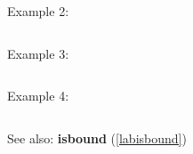 \noindent Example 2: 
\begin{center}\begin{minipage}{15cm}\begin{Verbatim}[frame=single]
\end{Verbatim}
\end{minipage}\end{center}
\noindent Example 3: 
\begin{center}\begin{minipage}{15cm}\begin{Verbatim}[frame=single]
\end{Verbatim}
\end{minipage}\end{center}
\noindent Example 4: 
\begin{center}\begin{minipage}{15cm}\begin{Verbatim}[frame=single]
\end{Verbatim}
\end{minipage}\end{center}
See also: \textbf{isbound} (\ref{labisbound})
